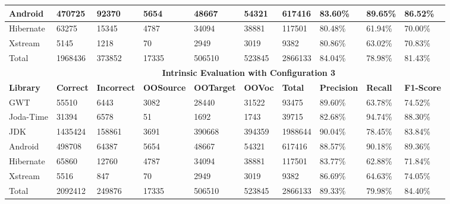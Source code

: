 \begin{table*}[t]
\begin{tabular}{|l|l|l|l|l|l|l|l|l|l|}
\hline
Android   & 470725                                    & 92370     & 5654     & 48667    & 54321  & 617416  & 83.60\%   & 89.65\% & 86.52\%  \\
\hline
Hibernate & 63275                                     & 15345     & 4787     & 34094    & 38881  & 117501  & 80.48\%   & 61.94\% & 70.00\%  \\
\hline
Xstream   & 5145                                      & 1218      & 70       & 2949     & 3019   & 9382    & 80.86\%   & 63.02\% & 70.83\%  \\
\hline
Total     & 1968436                                   & 373852    & 17335    & 506510   & 523845 & 2866133 & 84.04\%   & 78.98\% & 81.43\%  \\
\hline
          & \multicolumn{9}{c|}{\textbf{Intrinsic Evaluation with Configuration 3}}        \\
\hline
\textbf{Library}   & \textbf{Correct} & \textbf{Incorrect} & \textbf{OOSource} & \textbf{OOTarget} & \textbf{OOVoc}  & \textbf{Total}   & \textbf{Precision} & \textbf{Recall}  & \textbf{F1-Score} \\ \hline
GWT       & 55510                                     & 6443      & 3082     & 28440    & 31522  & 93475   & 89.60\%   & 63.78\% & 74.52\%  \\
\hline
Joda-Time & 31394                                     & 6578      & 51       & 1692     & 1743   & 39715   & 82.68\%   & 94.74\% & 88.30\%  \\
\hline
JDK       & 1435424                                   & 158861    & 3691     & 390668   & 394359 & 1988644 & 90.04\%   & 78.45\% & 83.84\%  \\
\hline
Android   & 498708                                    & 64387     & 5654     & 48667    & 54321  & 617416  & 88.57\%   & 90.18\% & 89.36\%  \\
\hline
Hibernate & 65860                                     & 12760     & 4787     & 34094    & 38881  & 117501  & 83.77\%   & 62.88\% & 71.84\%  \\
\hline
Xstream   & 5516                                      & 847       & 70       & 2949     & 3019   & 9382    & 86.69\%   & 64.63\% & 74.05\%  \\
\hline
Total     & 2092412                                   & 249876    & 17335    & 506510   & 523845 & 2866133 & 89.33\%   & 79.98\% & 84.40\%  \\
\hline
\end{tabular}

\label{tbl:Intrinsic}
\end{table*}

